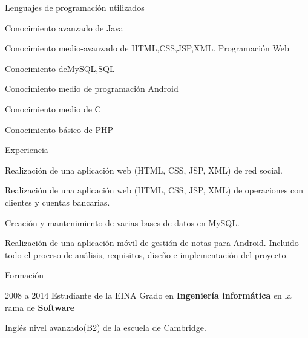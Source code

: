 \begin{cv}{}
\vspace{2em}	
\begin{cvlist}{Lenguajes de programación utilizados}
\item Conocimiento avanzado de Java
\item Conocimiento medio-avanzado de HTML,CSS,JSP,XML. Programación Web
\item Conocimiento deMySQL,SQL
\item Conocimiento medio de programación Android
\item Conocimiento medio de C
\item Conocimiento básico de PHP
\end{cvlist}

\begin{cvlist}{Experiencia}

	\item Realización de una aplicación web (HTML, CSS, JSP, XML) de red social.
	\item Realización de una aplicación web (HTML, CSS, JSP, XML) de operaciones con clientes y
cuentas bancarias.
	\item Creación y mantenimiento de varias bases de datos en MySQL.
	\item Realización de una aplicación móvil de gestión de notas para Android. Incluido todo el
proceso de análisis, requisitos, diseño e implementación del proyecto.

\end{cvlist}

\begin{cvlist}{Formación}

	\item[2008 a 2014] Estudiante de la EINA
		Grado en \textbf{Ingeniería informática} en la rama de \textbf{Software}\\
	\item[Inglés]  nivel avanzado(B2) de la escuela de Cambridge.


\end{cvlist}

\end{cv}